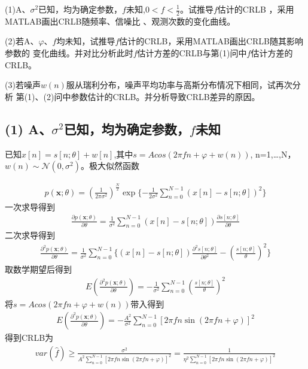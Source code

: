 \documentclass[fontset=windows]{article}
\numberwithin{figure}{section}
\begin{document}
(1)A、\(\sigma^2\)已知，均为确定参数，\(f\)未知,\(0<f<\frac{1}{2}\)。试推导\(f\)估计的CRLB
，采用MATLAB画出CRLB随频率、信噪比 、观测次数的变化曲线。

(2)若A、\(\varphi\)、\(f\)均未知，试推导\(f\)估计的CRLB，采用MATLAB画出CRLB随其影响参数的
变化曲线。并对比分析此时\(f\)估计方差的CRLB与第(1)问中\(f\)估计方差的CRLB。

(3)若噪声\(w(n)\)服从瑞利分布，噪声平均功率与高斯分布情况下相同，试再次分析
第(1)、(2)问中参数估计的CRLB。并分析导致CRLB差异的原因。

\subsection*{(1) A、\(\sigma^2\)已知，均为确定参数，\(f\)未知}

已知\(x[n]=s[n;\theta]+w[n]\),其中\(s=Acos(2\pi f n +\varphi + w(n))\),
n=1,…,N，\(w(n)\sim \mathcal{N} (0,\sigma^2)\)。极大似然函数

\begin{align*}
    p(\mathbf{x};\theta)=(\frac{1}{2\pi \sigma^2})^{\frac{N}{2}}
    \exp\{ -\frac{1}{2\sigma^2}\sum_{n=0}^{N-1}(x[n]-s[n;\theta])^2 \}
\end{align*}
一次求导得到
\begin{align*}
    \frac{\partial p(\mathbf{x};\theta)}{\partial \theta}=
    \frac{1}{\sigma^2}\sum_{n=0}^{N-1}(x[n]-s[n;\theta])\frac{\partial s[n;\theta]}{\partial\theta}
\end{align*}
二次求导得到
\begin{align*}
    \frac{\partial^2 p(\mathbf{x};\theta)}{\partial \theta}=
    \frac{1}{\sigma^2}\sum_{n=0}^{N-1}\{(x[n]-s[n;\theta])
    \frac{\partial^2 s[n;\theta]}{\partial\theta^2}
    -\left(\frac{s[n;\theta]}{\theta}\right)^2\}
\end{align*}
取数学期望后得到
\begin{align*}
    E\left(\frac{\partial^2 p(\mathbf{x};\theta)}{\partial \theta}\right)=
    -\frac{1}{\sigma^2}\sum_{n=0}^{N-1}
    \left(\frac{s[n;\theta]}{\theta}\right)^2
\end{align*}
将\(s=Acos(2\pi f n +\varphi + w(n))\)带入得到
\begin{align*}
    E\left(\frac{\partial^2 p(\mathbf{x};\theta)}{\partial \theta}\right)=
    -\frac{A^2}{\sigma^2}\sum_{n=0}^{N-1}
    \left[2\pi f n \sin(2\pi f n+\varphi)\right]^2
\end{align*}
得到CRLB为
\begin{align*}
    var(\hat{f})
    \geq \frac{\sigma^2}{A^2 \sum_{n=0}^{N-1}
        \left[2\pi f n \sin(2\pi f n+\varphi)\right]^2}
    =	\frac{1}{\eta ^2 \sum_{n=0}^{N-1}
        \left[2\pi f n \sin(2\pi f n+\varphi)\right]^2}
\end{align*}
\end{document}
